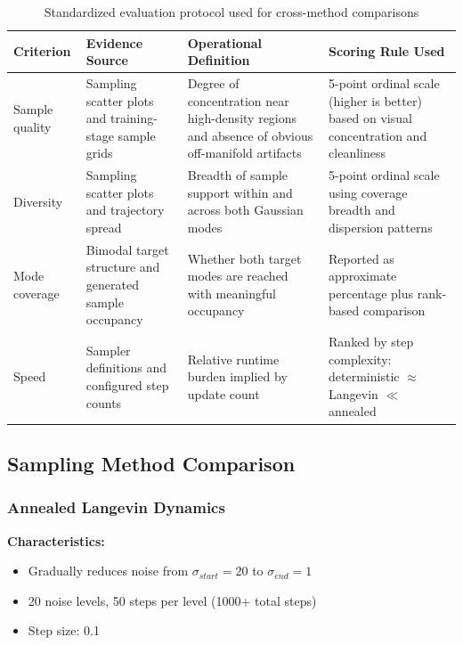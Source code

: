 \documentclass[journal]{IEEEtran}
\begin{document}
\begin{table}[t]
\centering
\small
\setlength{\tabcolsep}{4pt}
\begin{tabular}{p{}p{}p{}p{}}
\toprule
Criterion & Evidence Source & Operational Definition & Scoring Rule Used \\
\midrule
Sample quality & Sampling scatter plots and training-stage sample grids & Degree of concentration near high-density regions and absence of obvious off-manifold artifacts & 5-point ordinal scale (higher is better) based on visual concentration and cleanliness \\
\midrule
Diversity & Sampling scatter plots and trajectory spread & Breadth of sample support within and across both Gaussian modes & 5-point ordinal scale using coverage breadth and dispersion patterns \\
\midrule
Mode coverage & Bimodal target structure and generated sample occupancy & Whether both target modes are reached with meaningful occupancy & Reported as approximate percentage plus rank-based comparison \\
\midrule
Speed & Sampler definitions and configured step counts & Relative runtime burden implied by update count & Ranked by step complexity: deterministic $\approx$ Langevin $\ll$ annealed \\
\bottomrule
\end{tabular}
\normalsize
\caption{Standardized evaluation protocol used for cross-method comparisons}
\label{tab:evaluation_protocol}
\end{table}

\subsection{Sampling Method Comparison}

\subsubsection{Annealed Langevin Dynamics}

\textbf{Characteristics:}
\begin{itemize}
    \item Gradually reduces noise from $\sigma_{start}=20$ to $\sigma_{end}=1$
    \item 20 noise levels, 50 steps per level (1000+ total steps)
    \item Step size: 0.1
\end{itemize}
\end{document}
